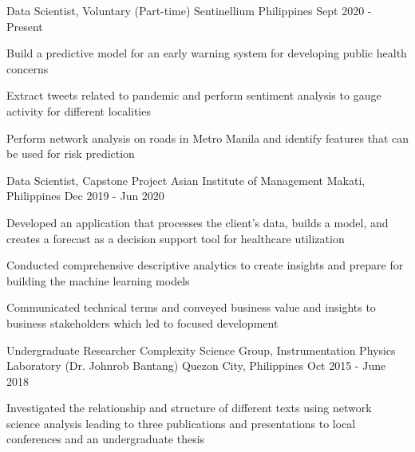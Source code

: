 

\begin{cventries}
  \cventry
    {Data Scientist, Voluntary (Part-time)} %
    {Sentinellium} %
    {Philippines} %
    {Sept 2020 - Present} %
    {
      \begin{cvitems} %
        \item {Build a predictive model for an early warning system for developing public health concerns}
        \item {Extract tweets related to pandemic and perform sentiment analysis to gauge activity for different localities}
        \item {Perform network analysis on roads in Metro Manila and identify features that can be used for risk prediction}
      \end{cvitems}
    }


  \cventry
    {Data Scientist, Capstone Project} %
    {Asian Institute of Management} %
    {Makati, Philippines} %
    {Dec 2019 - Jun 2020} %
    {
      \begin{cvitems} %
        \item {Developed an application that processes the client's data, builds a model, and creates a forecast as a decision support tool for healthcare utilization}
        \item {Conducted comprehensive descriptive analytics to create insights and prepare for building the machine learning models}
        \item {Communicated technical terms and conveyed business value and insights to business stakeholders which led to focused development}
      \end{cvitems}
    }

  \cventry
    {Undergraduate Researcher} %
    {Complexity Science Group, Instrumentation Physics Laboratory (Dr. Johnrob Bantang)} %
    {Quezon City, Philippines} %
    {Oct 2015 - June 2018} %
    {
      \begin{cvitems} %
        \item {Investigated the relationship and structure of different texts using network science analysis leading to three publications and presentations to local conferences and an undergraduate thesis}
      \end{cvitems}
    }


\end{cventries}

